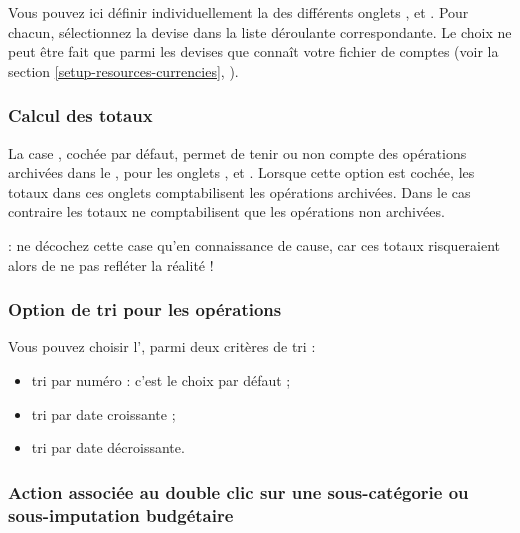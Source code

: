 Vous pouvez ici définir individuellement la  des différents onglets ,  et . Pour chacun, sélectionnez la devise dans la liste déroulante correspondante. Le choix ne peut être fait que parmi les devises que connaît votre fichier de comptes (voir la section \vref{setup-resources-currencies}, ).


\subsubsection{Calcul des totaux\label{setup-display-third-sum}}

La case , cochée par défaut, permet de tenir ou non compte des opérations archivées dans le , pour les onglets ,  et . Lorsque cette option est cochée, les totaux dans ces onglets comptabilisent les opérations archivées. Dans le cas contraire les totaux ne comptabilisent que les opérations non archivées.

 : ne décochez cette case qu'en connaissance de cause, car ces totaux risqueraient alors de ne pas refléter la réalité !


\subsubsection{Option de tri pour les opérations\label{setup-display-third-sort}}

Vous pouvez choisir l', parmi deux critères de \gls{tri} :

\begin{itemize}
	\item tri par numéro : c'est le choix par défaut ;
	\item tri par date croissante ;
	\item tri par date décroissante.
\end{itemize}


\subsubsection{Action associée au double clic sur une sous-catégorie ou sous-imputation budgétaire\label{setup-display-third-mouse}}


